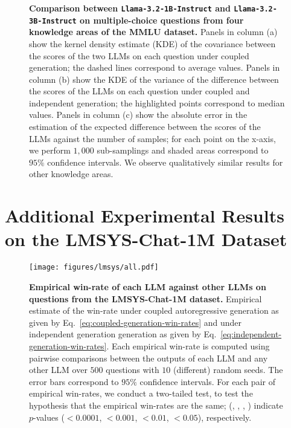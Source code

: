 \begin{figure}[h]
\begin{tabular}{c c c}
\end{tabular}
    \caption{\textbf{Comparison between \texttt{Llama-3.2-1B-Instruct} and \texttt{Llama-3.2-3B-Instruct} on multiple-choice questions from four knowledge areas of the MMLU dataset.}
    Panels in column (a) show the kernel density estimate (KDE) of the covariance between the scores of the two LLMs on each question under coupled generation; the dashed lines correspond to average values. Panels in column (b) show the KDE of the variance of the difference between the scores of the LLMs on each question under coupled and independent generation; the highlighted points correspond to median values. Panels in column (c) show the absolute error in the estimation of the expected difference between the scores of the LLMs against the number of samples; for each point on the x-axis, we perform $1{,}000$ sub-samplings and shaded areas correspond to $95\%$ confidence intervals. We observe qualitatively similar results for other knowledge areas.}
    \label{fig:mmlu-1B-vs-3B-areas}
\end{figure}

\clearpage
\newpage

\section{Additional Experimental Results on the LMSYS-Chat-1M Dataset} \label{app:lmsys}
%
\begin{figure}[h]
\centering
\texttt{[image: figures/lmsys/all.pdf]}
%
\caption{
\textbf{Empirical win-rate of each LLM against other LLMs 
on questions from the LMSYS-Chat-1M dataset.} 
%
Empirical estimate of the win-rate under coupled autoregressive generation as given by Eq.~\ref{eq:coupled-generation-win-rates} and under independent generation generation as given by  Eq.~\ref{eq:independent-generation-win-rates}. 
%
Each empirical win-rate is computed using pairwise comparisons between the outputs of each LLM and any other LLM over $500$ questions with $10$ (different) random seeds.
%
The error bars correspond to $95\%$ confidence intervals.
%
For each pair of empirical win-rates, we conduct a two-tailed test, to test the hypothesis that the empirical win-rates are the same; (\fourstars, \threestars, \twostars, \onestar) indicate $p$-values ($<0.0001$, $<0.001$, $<0.01$, $<0.05$), respectively.
}
\label{fig:lmsys-all-llms}
\end{figure}